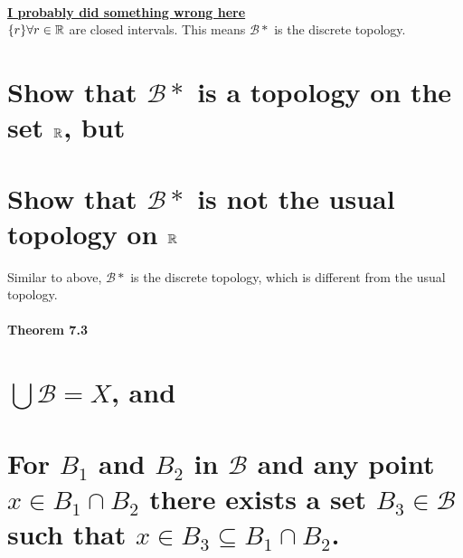 \begin{solution}
  \\\underline{\textbf{I probably did something wrong here}} \\
  $\{r\} \forall r \in \mathbb{R}$ are closed intervals. This means $\mathcal{B}*$ is the discrete topology.
\end{solution}


\begin{parts}
 \part{Show that $\mathcal{B}*$ is a topology on the set $\mathbb{R}$, but}
 \part{Show that $\mathcal{B}*$ is not the usual topology on $\mathbb{R}$}
\end{parts}

\begin{solution}
 Similar to above, $\mathcal{B}*$ is the discrete topology, which is different from the usual topology.
\end{solution}

\subsection{Theorem 7.3}\label{thm4.7.3}
\setcounter{question}{0}


\begin{parts}
 \part{$\bigcup \mathcal{B} = X$, and}
 \part{For $B_1$ and $B_2$ in $\mathcal{B}$ and any point $x \in B_1 \cap B_2$ there exists a set $B_3 \in \mathcal{B}$ such that $x \in B_3 \subseteq B_1 \cap B_2$.}
\end{parts}

